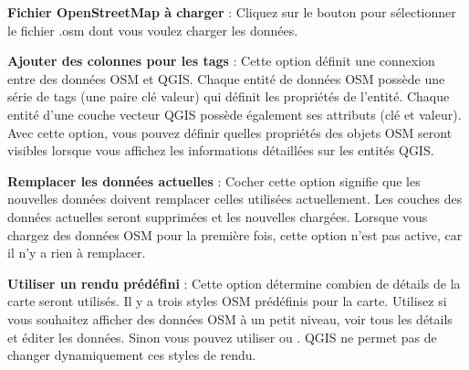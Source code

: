 \begin{description}
\item \textbf{Fichier OpenStreetMap à charger} : Cliquez sur le bouton pour sélectionner le fichier .osm dont vous voulez charger les données.
\item \textbf{Ajouter des colonnes pour les tags} : Cette option définit une connexion entre des données OSM et QGIS. Chaque entité de données OSM possède une série de tags (une paire clé valeur) qui définit les propriétés de l'entité. Chaque entité d'une couche vecteur QGIS possède également ses attributs (clé et valeur). Avec cette option, vous pouvez définir quelles propriétés des objets OSM seront visibles lorsque vous affichez les informations détaillées sur les entités QGIS.
\item \textbf{Remplacer les données actuelles} : Cocher cette option signifie que les nouvelles données doivent remplacer celles utilisées actuellement. Les couches des données actuelles seront supprimées et les nouvelles chargées. Lorsque vous chargez des données OSM pour la première fois, cette option n'est pas active, car il n'y a rien à remplacer.
\item \textbf{Utiliser un rendu prédéfini} : Cette option détermine combien de détails de la carte seront utilisés. Il y a trois styles OSM prédéfinis pour la carte. Utilisez  si vous souhaitez afficher des données OSM à un petit niveau, voir tous les détails et éditer les données. Sinon vous pouvez utiliser  ou . QGIS \CURRENT ne permet pas de changer dynamiquement ces styles de rendu.
\end{description}

